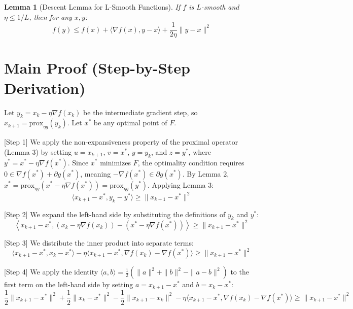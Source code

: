 \documentclass{article}
\newtheorem{lemma}[theorem]{Lemma}
\begin{document}
\begin{lemma}[Descent Lemma for L-Smooth Functions]
If $f$ is $L$-smooth and $\eta \leq 1/L$, then for any $x, y$:
\begin{equation}
    f(y) \leq f(x) + \langle \nabla f(x), y - x \rangle + \frac{1}{2\eta} \|y - x\|^2
\end{equation}
\end{lemma}

\section*{Main Proof (Step-by-Step Derivation)}
Let $y_k = x_k - \eta \nabla f(x_k)$ be the intermediate gradient step, so $x_{k+1} = \text{prox}_{\eta g}(y_k)$. Let $x^*$ be any optimal point of $F$. 

[Step 1] We apply the non-expansiveness property of the proximal operator (Lemma 3) by setting $u = x_{k+1}$, $v = x^*$, $y = y_k$, and $z = y^*$, where $y^* = x^* - \eta \nabla f(x^*)$. Since $x^*$ minimizes $F$, the optimality condition requires $0 \in \nabla f(x^*) + \partial g(x^*)$, meaning $-\nabla f(x^*) \in \partial g(x^*)$. By Lemma 2, $x^* = \text{prox}_{\eta g}(x^* - \eta \nabla f(x^*)) = \text{prox}_{\eta g}(y^*)$. Applying Lemma 3:
\begin{equation}
    \langle x_{k+1} - x^*, y_k - y^* \rangle \geq \|x_{k+1} - x^*\|^2
\end{equation}

[Step 2] We expand the left-hand side by substituting the definitions of $y_k$ and $y^*$:
\begin{equation}
    \left\langle x_{k+1} - x^*, \left(x_k - \eta \nabla f(x_k)\right) - \left(x^* - \eta \nabla f(x^*)\right) \right\rangle \geq \|x_{k+1} - x^*\|^2
\end{equation}

[Step 3] We distribute the inner product into separate terms:
\begin{equation}
    \langle x_{k+1} - x^*, x_k - x^* \rangle - \eta \langle x_{k+1} - x^*, \nabla f(x_k) - \nabla f(x^*) \rangle \geq \|x_{k+1} - x^*\|^2
\end{equation}

[Step 4] We apply the identity $\langle a, b \rangle = \frac{1}{2}(\|a\|^2 + \|b\|^2 - \|a - b\|^2)$ to the first term on the left-hand side by setting $a = x_{k+1} - x^*$ and $b = x_k - x^*$:
\begin{equation}
    \frac{1}{2} \|x_{k+1} - x^*\|^2 + \frac{1}{2} \|x_k - x^*\|^2 - \frac{1}{2} \|x_{k+1} - x_k\|^2 - \eta \langle x_{k+1} - x^*, \nabla f(x_k) - \nabla f(x^*) \rangle \geq \|x_{k+1} - x^*\|^2
\end{equation}
\end{document}
